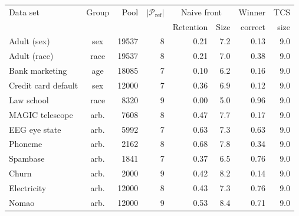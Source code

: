 \begin{tabular}{lcrrrrrr}\toprule
Data set & Group & Pool & $|\mathcal{P}_{\mathrm{ref}}|$ & \multicolumn{2}{c}{Naive front} & Winner & TCS \\
 & & & & Retention & Size & correct & size \\\midrule
Adult (sex) & sex & 19537 & 8 & 0.21 & 7.2 & 0.13 & 9.0 \\
Adult (race) & race & 19537 & 8 & 0.21 & 7.0 & 0.38 & 9.0 \\
Bank marketing & age & 18085 & 7 & 0.10 & 6.2 & 0.16 & 9.0 \\
Credit card default & sex & 12000 & 7 & 0.36 & 6.9 & 0.12 & 9.0 \\
Law school & race & 8320 & 9 & 0.00 & 5.0 & 0.96 & 9.0 \\
MAGIC telescope & arb. & 7608 & 8 & 0.47 & 7.7 & 0.17 & 9.0 \\
EEG eye state & arb. & 5992 & 7 & 0.63 & 7.3 & 0.63 & 9.0 \\
Phoneme & arb. & 2162 & 8 & 0.68 & 7.8 & 0.34 & 9.0 \\
Spambase & arb. & 1841 & 7 & 0.37 & 6.5 & 0.76 & 9.0 \\
Churn & arb. & 2000 & 9 & 0.42 & 8.2 & 0.14 & 9.0 \\
Electricity & arb. & 12000 & 8 & 0.43 & 7.3 & 0.76 & 9.0 \\
Nomao & arb. & 12000 & 9 & 0.53 & 8.4 & 0.71 & 9.0 \\
\bottomrule\end{tabular}